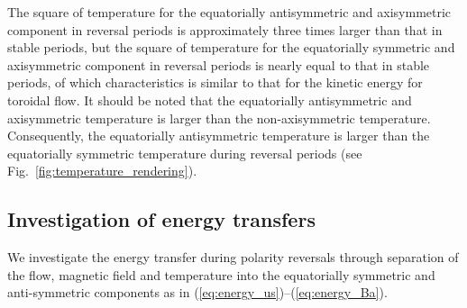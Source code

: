 {\color{teal}
The square of temperature for the equatorially antisymmetric and axisymmetric component in reversal periods is approximately three times larger than that in stable periods, but the square of temperature for the equatorially symmetric and axisymmetric component in reversal periods is nearly equal to that in stable periods, of which characteristics is similar to that for the kinetic energy for toroidal flow.
}
{\color{teal}
It should be noted that the equatorially antisymmetric and axisymmetric temperature is larger than the non-axisymmetric temperature.
}
Consequently, the equatorially antisymmetric temperature is larger than the equatorially symmetric temperature during reversal periods (see Fig.~\ref{fig:temperature_rendering}). 



\subsection{Investigation of energy transfers}
\label{sec:energy_transfer}

{\color{teal}
We investigate the energy transfer during polarity reversals through separation of the flow, magnetic field and temperature into the equatorially symmetric and anti-symmetric components as in (\ref{eq:energy_us})--(\ref{eq:energy_Ba}).
}


